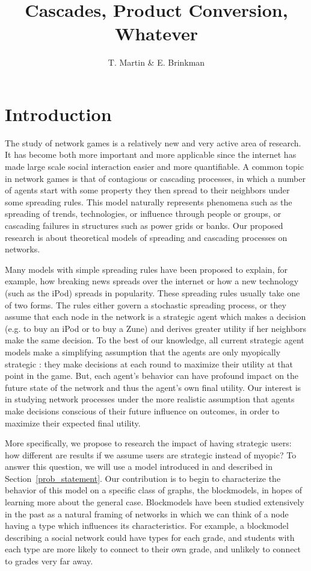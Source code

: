 \documentclass{article}
\title{Cascades, Product Conversion, Whatever}
\author{T. Martin \& E. Brinkman}
\begin{document}
\maketitle

\section{Introduction}
\label{intro}

The study of network games is a relatively new and very active area of
research. It has become both more important and more applicable since
the internet has made large scale social interaction easier and more
quantifiable. A common topic in network games is that of contagious or
cascading processes, in which a number of agents start with some
property they then spread to their neighbors under some spreading
rules. This model naturally represents phenomena such as the spreading
of trends, technologies, or influence through people or groups, or
cascading failures in structures such as power grids or banks. Our
proposed research is about theoretical models of spreading and
cascading processes on networks.

Many models with simple spreading rules have been proposed
\cite{Arthur89, Morris00, Watts02} to explain, for example, how
breaking news spreads over the internet or how a new technology (such
as the iPod) spreads in popularity. These spreading rules usually take
one of two forms. The rules either govern a stochastic spreading
process, or they assume that each node in the network is a strategic
agent which makes a decision (e.g. to buy an iPod or to buy a Zune)
and derives greater utility if her neighbors make the same
decision. To the best of our knowledge, all current strategic agent
models make a simplifying assumption that the agents are only
myopically strategic \cite{Chierichetti12}: they make decisions at
each round to maximize their utility at that point in the game. But,
each agent's behavior can have profound impact on the future state of
the network and thus the agent's own final utility. Our interest is in
studying network processes under the more realistic assumption that
agents make decisions conscious of their future influence on outcomes,
in order to maximize their expected final utility.

More specifically, we propose to research the impact of having
strategic users: how different are results if we assume users are
strategic instead of myopic? To answer this question, we will use a
model introduced in \cite{Chierichetti12} and described in
Section~\ref{prob_statement}. Our contribution is to begin to
characterize the behavior of this model on a specific class of graphs,
the blockmodels, in hopes of learning more about the general
case. Blockmodels have been studied extensively in the past
\cite{Wang87, Snijders97} as a natural framing of networks in which we
can think of a node having a type which influences its
characteristics. For example, a blockmodel describing a social network
could have types for each grade, and students with each type are more
likely to connect to their own grade, and unlikely to connect to
grades very far away.
\end{document}
